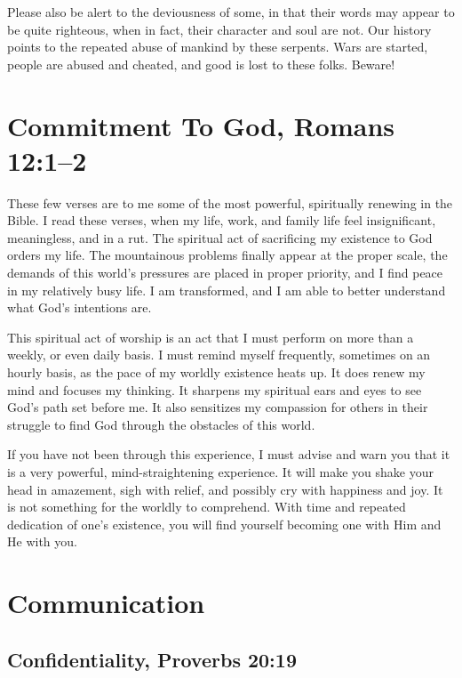 \documentclass[12pt]{memoir}
\begin{document}
Please also be alert to the deviousness of some, in that their words may appear to be quite righteous, when in fact, their character
and soul are not.
Our history points to the repeated abuse of mankind by these serpents. Wars are started, people are abused and cheated,
and good is lost to these folks. Beware!

\section[Commitment To God]{Commitment To God, Romans 12:1--2}

These few verses are to me some of the most powerful, spiritually
renewing in the Bible. I read these verses, when my life, work, and
family life feel insignificant, meaningless, and in a rut. The
spiritual act of sacrificing my existence to God orders my
life. The mountainous problems finally appear at the proper scale,
the demands of this world's pressures are placed in proper priority,
and I find peace in my relatively busy life. I am transformed, and
I am able to better understand what God's intentions are.

This spiritual act of worship is an act that I must perform
on more than a weekly, or even daily basis. I must remind myself
frequently, sometimes on an hourly basis, as the pace of my worldly
existence heats up. It does renew my mind and focuses
my thinking. It sharpens my spiritual ears and eyes to see God's path
set before me. It also sensitizes my compassion for others in their
struggle to find God through the obstacles of this world.

If you have not been through this experience, I must advise and warn
you that it is a very powerful, mind-straightening experience. It
will make you shake your head in amazement, sigh with relief, and
possibly cry with happiness and joy. It is not something for the worldly
to comprehend. With time and repeated dedication of one's existence,
you will find yourself becoming one with Him and He with you.

\section{Communication}

\subsection[Confidentiality]{Confidentiality, Proverbs 20:19}
\end{document}

